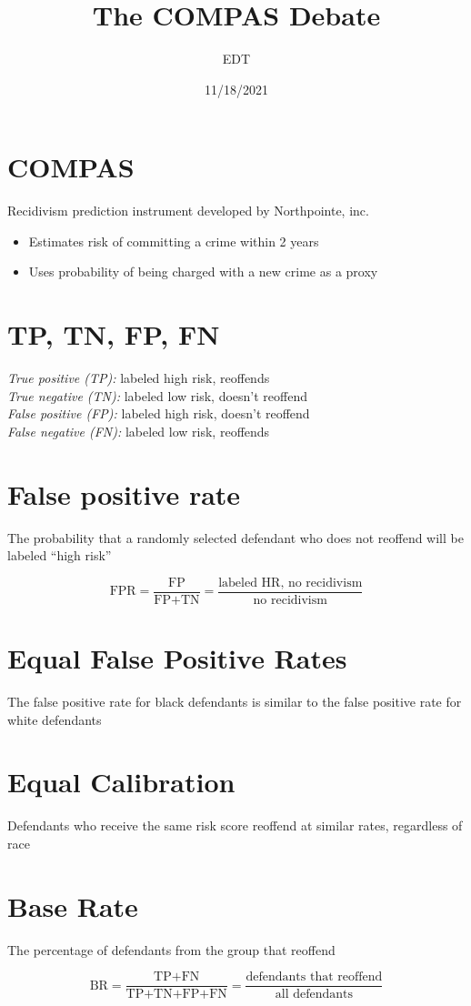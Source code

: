 \documentclass{dmghandout}
\author{EDT}
\date{11/18/2021}
\title{The COMPAS Debate}
\begin{document}
\section*{COMPAS}
\label{sec:org6fc921d}

Recidivism prediction instrument developed by Northpointe, inc.
\begin{itemize}
\item Estimates risk of committing a crime within 2 years
\item Uses probability of being charged with a new crime as a proxy
\end{itemize}

\section*{TP, TN, FP, FN}
\label{sec:orga06fa52}

\emph{True positive (TP):} labeled high risk, reoffends \\
\emph{True negative (TN):} labeled low risk, doesn't reoffend \\
\emph{False positive (FP):} labeled high risk, doesn't reoffend \\
\emph{False negative (FN):} labeled low risk, reoffends \\

\section*{False positive rate}
\label{sec:org470674d}

The probability that a randomly selected defendant who does not reoffend will be labeled “high risk”

$$\text{FPR} = \frac{\text{FP}}{\text{FP+TN}} = \frac{\text{labeled HR, no recidivism}}{\text{no recidivism}}$$

\section*{Equal False Positive Rates}
\label{sec:orgd7155ae}

The false positive rate for black defendants is similar to the false positive rate for white defendants

\section*{Equal Calibration}
\label{sec:org1c877f6}

Defendants who receive the same risk score reoffend at similar rates, regardless of race

\section*{Base Rate}
\label{sec:org5c219c1}

The percentage of defendants from the group that reoffend

$$\text{BR} = \frac{\text{TP+FN}}{\text{TP+TN+FP+FN}} = \frac{\text{defendants that reoffend}}{\text{all defendants}}$$
\end{document}
